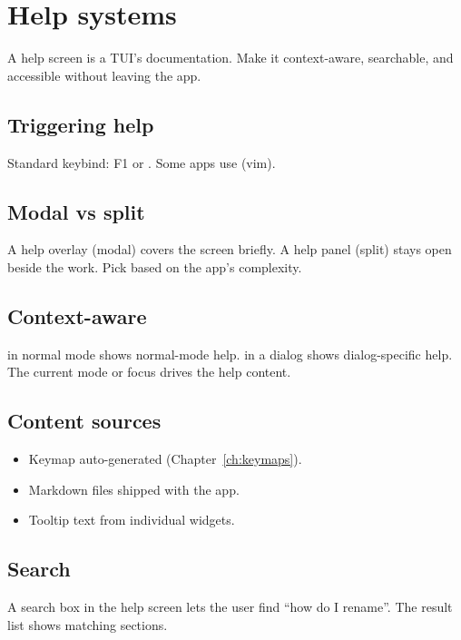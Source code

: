 \chapter{Help systems}
\label{ch:help}

\begin{aside}
A help screen is a TUI's documentation. Make it
context-aware, searchable, and accessible without leaving
the app.
\end{aside}

\section{Triggering help}

Standard keybind: F1 or . Some apps use
 (vim).

\section{Modal vs split}

A help overlay (modal) covers the screen briefly. A help
panel (split) stays open beside the work. Pick based on
the app's complexity.

\section{Context-aware}

 in normal mode shows normal-mode help.
 in a dialog shows dialog-specific help. The
current mode or focus drives the help content.

\section{Content sources}

\begin{itemize}[leftmargin=*]
  \item Keymap auto-generated (Chapter~\ref{ch:keymaps}).
  \item Markdown files shipped with the app.
  \item Tooltip text from individual widgets.
\end{itemize}

\section{Search}

A search box in the help screen lets the user find
``how do I rename''. The result list shows matching
sections.


